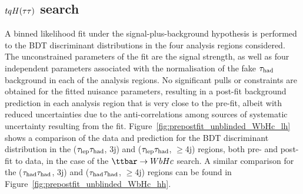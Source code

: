 %

\subsection{$tqH(\tau\tau)$ search}
\label{sec:results_Htautau}

A binned likelihood fit under the signal-plus-background hypothesis is performed to the BDT discriminant distributions in the four 
analysis regions considered. The unconstrained parameters of the fit are the signal 
strength, as well as four independent parameters associated with the normalisation of the fake $\tau_{\mathrm{had}}$ background in each of the analysis regions. 
No significant pulls or constraints are obtained for the fitted nuisance parameters, resulting in a post-fit background prediction in each analysis region that is
very close to the pre-fit, albeit with reduced uncertainties due to the anti-correlations among sources of systematic uncertainty resulting from the fit.
Figure~\ref{fig:prepostfit_unblinded_WbHc_lh} shows a comparison of the data and prediction for the BDT discriminant distribution in
the ($\tau_{\mathrm{lep}} \tau_{\mathrm{had}}$, 3j) and ($\tau_{\mathrm{lep}} \tau_{\mathrm{had}}$, $\geq$4j) regions, both pre- and post-fit to data, in the case of the $\Hc$ search.  
A similar comparison for the ($\tau_{\mathrm{had}} \tau_{\mathrm{had}}$, 3j) and ($\tau_{\mathrm{had}} \tau_{\mathrm{had}}$, $\geq$4j) regions can be found in Figure~\ref{fig:prepostfit_unblinded_WbHc_hh}.


